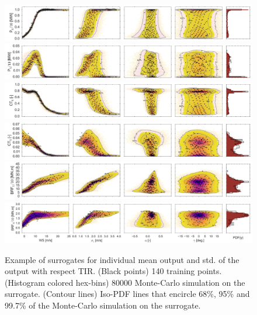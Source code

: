 \documentclass[preprint,12pt]{elsarticle}
\begin{document}
\begin{figure}[h!]
\begin{centering}
\includegraphics[width=\linewidth]{Figures/Surrgotes_20-fold/P_E_MC_PCE_last_row.jpg} \\
\includegraphics[width=\linewidth]{Figures/Surrgotes_20-fold/P_S_MC_PCE_last_row.jpg} \\
\includegraphics[width=\linewidth]{Figures/Surrgotes_20-fold/CT_E_MC_PCE_last_row.jpg} \\
\includegraphics[width=\linewidth]{Figures/Surrgotes_20-fold/CT_S_MC_PCE_last_row.jpg}\\
\includegraphics[width=\linewidth]{Figures/Surrgotes_20-fold/BRFBM_EFL_M12_E_MC_PCE_last_row.jpg} \\
\includegraphics[width=\linewidth]{Figures/Surrgotes_20-fold/BRFBM_EFL_M12_S_MC_PCE_last_row.jpg}
\caption{Example of surrogates for individual mean output and std. of the output with respect TIR. (Black points) 140 training points. (Histogram colored hex-bins) 80000 Monte-Carlo simulation on the surrogate. (Contour lines) Iso-PDF lines that encircle 68\%, 95\% and 99.7\% of the Monte-Carlo simulation on the surrogate.}
\label{fig_y_hat_E_V}
\end{centering}
\end{figure}
\end{document}
